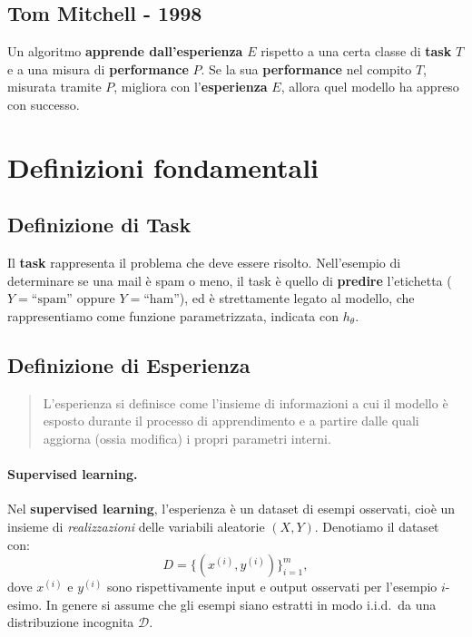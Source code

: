\subsection{Tom Mitchell - 1998}

Un algoritmo \textbf{apprende dall'esperienza} $E$ rispetto a una certa classe di \textbf{task} $T$ e a una misura di \textbf{performance} $P$. Se la sua \textbf{performance} nel compito $T$, misurata tramite $P$, migliora con l'\textbf{esperienza} $E$, allora quel modello ha appreso con successo.

\section{Definizioni fondamentali}

\subsection{Definizione di Task}

Il \textbf{task} rappresenta il problema che deve essere risolto. Nell'esempio di determinare se una mail \`e spam o meno, il task \`e quello di \textbf{predire} l'etichetta ($Y=\text{``spam''}$ oppure $Y=\text{``ham''}$), ed \`e strettamente legato al modello, che rappresentiamo come funzione parametrizzata, indicata con $h_\theta$.

\subsection{Definizione di Esperienza}

\begin{quote}
L'esperienza si definisce come l'insieme di informazioni a cui il modello \`e esposto durante il processo di apprendimento e a partire dalle quali aggiorna (ossia modifica) i propri parametri interni.
\end{quote}

\paragraph{Supervised learning.}
Nel \textbf{supervised learning}, l'esperienza \`e un dataset di esempi osservati, cio\`e un insieme di \emph{realizzazioni} delle variabili aleatorie $(X, Y)$. Denotiamo il dataset con:
\[
D = \{(x^{(i)}, y^{(i)})\}_{i=1}^m,
\]
dove $x^{(i)}$ e $y^{(i)}$ sono rispettivamente input e output osservati per l'esempio $i$-esimo. In genere si assume che gli esempi siano estratti in modo i.i.d.\ da una distribuzione incognita $\mathcal{D}$.

